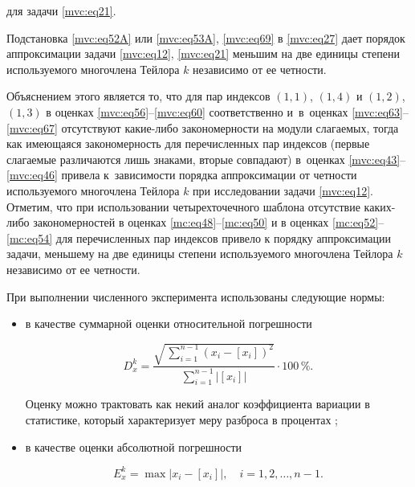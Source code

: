 для задачи \eqref{mvc:eq21}.





Подстановка \eqref{mvc:eq52A} или \eqref{mvc:eq53A}, \eqref{mvc:eq69} в \eqref{mvc:eq27} дает порядок аппроксимации задачи \eqref{mvc:eq12}, \eqref{mvc:eq21} меньшим на две единицы степени используемого многочлена Тейлора $   k$ независимо от ее четности. 

Объяснением этого является то, что для пар индексов  $   (1,  1)$, $   (1,  4)$  и $   (1,  2)$, $   (1,  3)$ в оценках \eqref{mvc:eq56}--\eqref{mvc:eq60} соответственно  и~в~оценках \eqref{mvc:eq63}--\eqref{mvc:eq67} отсутствуют какие-либо закономерности на модули слагаемых, тогда как имеющаяся закономерность для перечисленных пар индексов (первые слагаемые различаются лишь знаками, вторые совпадают) в~оценках \eqref{mvc:eq43}--\eqref{mvc:eq46} привела к~зависимости порядка аппроксимации от четности используемого многочлена Тейлора $k$ при исследовании задачи \eqref{mvc:eq12}. Отметим, что при использовании четырехточечного шаблона отсутствие каких-либо закономерностей в оценках \eqref{mc:eq48}--\eqref{mc:eq50} и в оценках \eqref{mc:eq52}--\eqref{mc:eq54} для перечисленных пар индексов  привело к порядку аппроксимации задачи,  меньшему на две единицы степени используемого многочлена Тейлора $   k$ независимо от ее четности.



\smallskip 




При выполнении численного эксперимента использованы следующие нормы:

\begin{itemize}

\item[--]   в качестве суммарной оценки относительной погрешности 

\begin{equation}

\label{mc:eq59}

D_x^k=\frac{\sqrt{\,\sum_{i=1}^{n-1}\left(x_i-\left[x_i\right]\right)^2}}{\sum_{i=1}^{n-1}\bigl|\left[x_i\right]\bigl|} \cdot 100\,\%.

\end{equation}

Оценку можно трактовать как некий аналог коэффициента вариации в статистике, который характеризует меру разброса в процентах  \cite{mc:bib16}; 

\item[--] 

в качестве оценки абсолютной погрешности \cite{mc:bib6, mc:bib7}

\begin{equation}

\label{mc:eq60}

E_x^k=\max\bigl|x_i-[x_i]\bigl|, \quad i=1,  2,  \dots,  n-1.

\end{equation}

\end{itemize}



